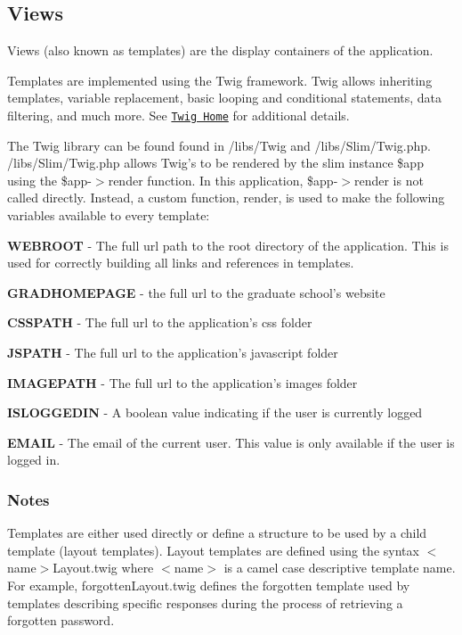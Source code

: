 \subsection*{Views}

Views (also known as templates) are the display containers of the application.

Templates are implemented using the Twig framework. Twig allows inheriting templates, variable replacement, basic looping and conditional statements, data filtering, and much more. See \href{http://twig.sensiolabs.org/}{\tt Twig Home} for additional details.

The Twig library can be found found in /libs/\-Twig and /libs/\-Slim/\-Twig.php. /libs/\-Slim/\-Twig.php allows Twig's to be rendered by the slim instance \$app using the \$app-\/$>$render function. In this application, \$app-\/$>$render is not called directly. Instead, a custom function, render, is used to make the following variables available to every template\-:


\begin{DoxyItemize}
\item {\bfseries W\-E\-B\-R\-O\-O\-T} -\/ The full url path to the root directory of the application. This is used for correctly building all links and references in templates.
\item {\bfseries G\-R\-A\-D\-H\-O\-M\-E\-P\-A\-G\-E} -\/ the full url to the graduate school's website
\item {\bfseries C\-S\-S\-P\-A\-T\-H} -\/ The full url to the application's css folder
\item {\bfseries J\-S\-P\-A\-T\-H} -\/ The full url to the application's javascript folder
\item {\bfseries I\-M\-A\-G\-E\-P\-A\-T\-H} -\/ The full url to the application's images folder
\item {\bfseries I\-S\-L\-O\-G\-G\-E\-D\-I\-N} -\/ A boolean value indicating if the user is currently logged
\item {\bfseries E\-M\-A\-I\-L} -\/ The email of the current user. This value is only available if the user is logged in.
\end{DoxyItemize}

\subsubsection*{Notes}


\begin{DoxyItemize}
\item Templates are either used directly or define a structure to be used by a child template (layout templates). Layout templates are defined using the syntax $<$name$>$Layout.\-twig where $<$name$>$ is a camel case descriptive template name. For example, forgotten\-Layout.\-twig defines the forgotten template used by templates describing specific responses during the process of retrieving a forgotten password.
\end{DoxyItemize}


